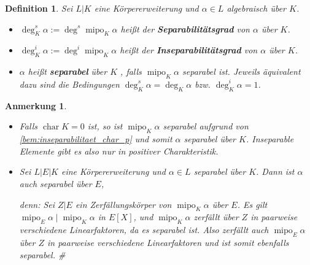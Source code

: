 \documentclass[a4paper, twoside, 11pt, ngerman]{report}
\DeclareMathOperator{\charact}{char}
\DeclareMathOperator{\mipo}{mipo}
\theoremstyle{definistyle}
\newtheorem{defini}[satz]{Definition}
\newtheorem{anm}[satz]{Anmerkung}
\theoremstyle{remark}
\newenvironment{denn}%
  {\par\textit{denn:}}%
  {\hfill\#\par}
\newcommand{\defn}[1]{\textit{\bfseries #1}}
\begin{document}
\begin{defini}\label{def:el_sepgrad_insepgrad}
Sei $L|K$ eine Körpererweiterung und $\alpha \in L$ algebraisch über $K$.
\begin{itemize}
    \item $\deg^s_K \alpha := \deg^s \mipo_K \alpha$ heißt der \defn{Separabilitätsgrad} von $\alpha$ über $K$.
    \item $\deg^i_K \alpha := \deg^i \mipo_K \alpha$ heißt der \defn{Inseparabilitätsgrad} von $\alpha$ über $K$.
    \item $\alpha$ heißt \defn{separabel} über $K$ , falls $\mipo_K \alpha$ separabel ist. Jeweils äquivalent dazu sind die Bedingungen $\deg^s_K \alpha = \deg_K \alpha$ bzw. $\deg^i_K \alpha =1$. 
\end{itemize}
\end{defini}

\begin{anm}\label{anm:inseparabilitaet_nur_pos_char}
\begin{itemize}
\item Falls $\charact K = 0$ ist, so ist $\mipo_K \alpha$ separabel aufgrund von \ref{bem:inseparabilitaet_char_p}
und somit $\alpha$ separabel über $K$. Inseparable Elemente gibt es also nur in positiver Charakteristik.
\item Sei $L|E|K$ eine Körpererweiterung und $\alpha \in L$ separabel über $K$. Dann ist $\alpha$ auch separabel über $E$,
\begin{denn}
Sei $Z|E$ ein Zerfällungskörper von $\mipo_K \alpha$ über $E$. Es gilt $\mipo_E \alpha \mid \mipo_K \alpha$ in $E[X]$, und $\mipo_K \alpha$ zerfällt über $Z$ in paarweise verschiedene Linearfaktoren, da es separabel ist. Also zerfällt auch $\mipo_E \alpha$ über $Z$ in paarweise verschiedene Linearfaktoren und ist somit ebenfalls separabel.
\end{denn}
\end{itemize}
\end{anm}
\end{document}
